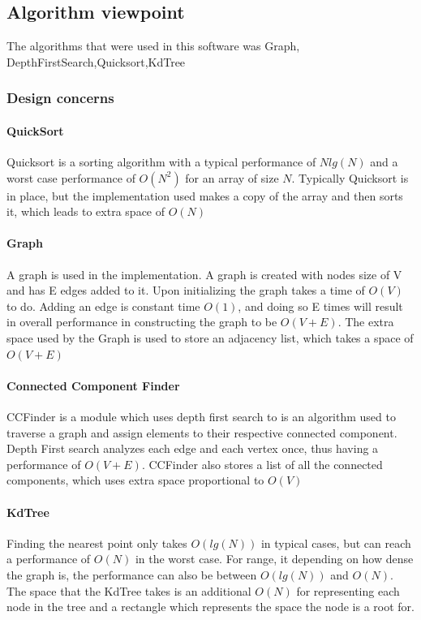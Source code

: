 \documentclass[12pt]{article}
\begin{document}
        \subsection{Algorithm viewpoint}
            The algorithms that were used in this software was Graph, DepthFirstSearch,Quicksort,KdTree
            \subsubsection{Design concerns}
                \paragraph{QuickSort} Quicksort is a sorting algorithm with a typical performance of $Nlg(N)$ and a worst case performance of
                $O(N^2)$ for an array of size $N$. Typically Quicksort is in place, but the implementation used makes a copy of the
                array and then sorts it, which leads to extra space of $O(N)$\\
                
                \paragraph{Graph} A graph is used in the implementation. A graph is created with nodes size of V and has E edges added to it. Upon initializing the graph takes a time of $O(V)$ to do. Adding an edge is constant time $O(1)$, and doing so E times will result in overall 
                performance in constructing the graph to be $O(V + E)$. The extra space used by the Graph is used to store an adjacency list,
                which takes a space of $O(V+E)$\\
                
                \paragraph{Connected Component Finder} CCFinder is a module which uses depth first search to  is an algorithm used to traverse a graph and assign elements to their respective connected component. Depth First search analyzes each edge and each vertex once, thus having a performance of $O(V + E)$. CCFinder also stores a list of all the connected components, which uses extra space proportional to $O(V)$\\
                
                \paragraph{KdTree} Finding the nearest point only takes $O(lg(N))$ in typical cases, but can reach a performance of $O(N)$ in the worst case. For range, it depending on how dense the graph is, the performance can also be between $O(lg(N))$ and $O(N)$. The space that the KdTree takes is an additional $O(N)$ for representing each node in the tree and a rectangle which represents the space the node is a root for.\\
                
\end{document}
